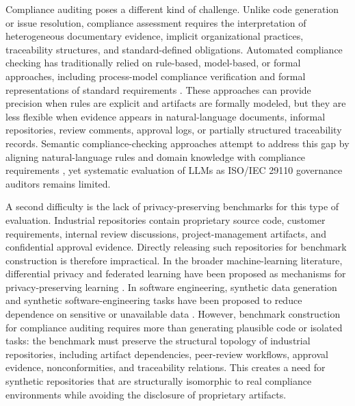 \documentclass{ieeeaccess}
\begin{document}
Compliance auditing poses a different kind of challenge. Unlike code generation or issue resolution, compliance assessment requires the interpretation of heterogeneous documentary evidence, implicit organizational practices, traceability structures, and standard-defined obligations. Automated compliance checking has traditionally relied on rule-based, model-based, or formal approaches, including process-model compliance verification and formal representations of standard requirements \cite{castellanos2022processcompliance,castellanos2018spem,sirikrajai2025cpn,tuaycharoen2025auditorviews}. These approaches can provide precision when rules are explicit and artifacts are formally modeled, but they are less flexible when evidence appears in natural-language documents, informal repositories, review comments, approval logs, or partially structured traceability records. Semantic compliance-checking approaches attempt to address this gap by aligning natural-language rules and domain knowledge with compliance requirements \cite{guo2021semantic,zheng2022semantic}, yet systematic evaluation of LLMs as ISO/IEC 29110 governance auditors remains limited.

A second difficulty is the lack of privacy-preserving benchmarks for this type of evaluation. Industrial repositories contain proprietary source code, customer requirements, internal review discussions, project-management artifacts, and confidential approval evidence. Directly releasing such repositories for benchmark construction is therefore impractical. In the broader machine-learning literature, differential privacy and federated learning have been proposed as mechanisms for privacy-preserving learning \cite{dwork2006differentialprivacy,mcmahan2017communication}. In software engineering, synthetic data generation and synthetic software-engineering tasks have been proposed to reduce dependence on sensitive or unavailable data \cite{bauer2024syntheticdata,yang2025swesmith}. However, benchmark construction for compliance auditing requires more than generating plausible code or isolated tasks: the benchmark must preserve the structural topology of industrial repositories, including artifact dependencies, peer-review workflows, approval evidence, nonconformities, and traceability relations. This creates a need for synthetic repositories that are structurally isomorphic to real compliance environments while avoiding the disclosure of proprietary artifacts.
\end{document}

